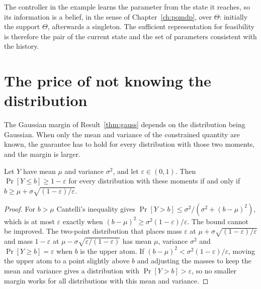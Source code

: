The controller in the example learns the parameter from the state it reaches, so its information is a belief, in the sense of Chapter~\ref{ch:pomdp}, over $\Theta$: initially the support $\Theta$, afterwards a singleton. The sufficient representation for feasibility is therefore the pair of the current state and the set of parameters consistent with the history.


\section{The price of not knowing the distribution}\label{sec:cantelli}

The Gaussian margin of Result~\ref{thm:gauss} depends on the distribution being Gaussian. When only the mean and variance of the constrained quantity are known, the guarantee has to hold for every distribution with those two moments, and the margin is larger.

\begin{established}\label{thm:cantelli}
Let $Y$ have mean $\mu$ and variance $\sigma^2$, and let $\varepsilon\in(0,1)$. Then $\Pr[Y\le b]\ge1-\varepsilon$ for every distribution with these moments if and only if $b\ge\mu+\sigma\sqrt{(1-\varepsilon)/\varepsilon}$.
\end{established}
\begin{proof}
For $b>\mu$ Cantelli's inequality gives $\Pr[Y>b]\le\sigma^2/(\sigma^2+(b-\mu)^2)$, which is at most $\varepsilon$ exactly when $(b-\mu)^2\ge\sigma^2(1-\varepsilon)/\varepsilon$. The bound cannot be improved. The two-point distribution that places mass $\varepsilon$ at $\mu+\sigma\sqrt{(1-\varepsilon)/\varepsilon}$ and mass $1-\varepsilon$ at $\mu-\sigma\sqrt{\varepsilon/(1-\varepsilon)}$ has mean $\mu$, variance $\sigma^2$ and $\Pr[Y\ge b]=\varepsilon$ when $b$ is the upper atom. If $(b-\mu)^2<\sigma^2(1-\varepsilon)/\varepsilon$, moving the upper atom to a point slightly above $b$ and adjusting the masses to keep the mean and variance gives a distribution with $\Pr[Y>b]>\varepsilon$, so no smaller margin works for all distributions with this mean and variance.
\end{proof}

